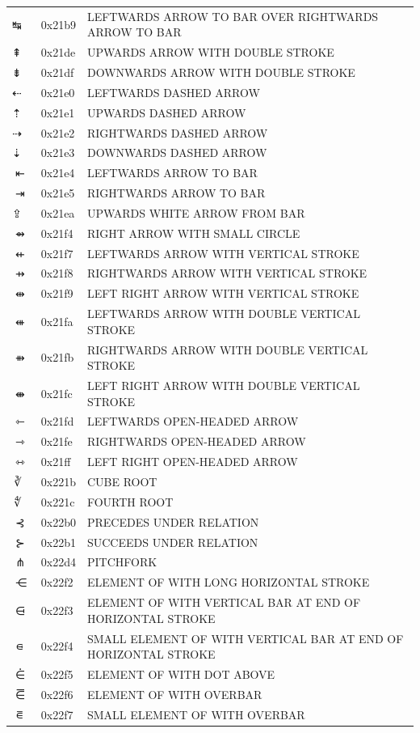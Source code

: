 \documentclass[12pt, twoside]{article}
\begin{document}
\begin{longtable}{L{1.0cm} L{2.0cm} >{\footnotesize}L{10cm}}
$↹$&0x21b9&LEFTWARDS ARROW TO BAR OVER RIGHTWARDS ARROW TO BAR\\
$⇞$&0x21de&UPWARDS ARROW WITH DOUBLE STROKE\\
$⇟$&0x21df&DOWNWARDS ARROW WITH DOUBLE STROKE\\
$⇠$&0x21e0&LEFTWARDS DASHED ARROW\\
$⇡$&0x21e1&UPWARDS DASHED ARROW\\
$⇢$&0x21e2&RIGHTWARDS DASHED ARROW\\
$⇣$&0x21e3&DOWNWARDS DASHED ARROW\\
$⇤$&0x21e4&LEFTWARDS ARROW TO BAR\\
$⇥$&0x21e5&RIGHTWARDS ARROW TO BAR\\
$⇪$&0x21ea&UPWARDS WHITE ARROW FROM BAR\\
$⇴$&0x21f4&RIGHT ARROW WITH SMALL CIRCLE\\
$⇷$&0x21f7&LEFTWARDS ARROW WITH VERTICAL STROKE\\
$⇸$&0x21f8&RIGHTWARDS ARROW WITH VERTICAL STROKE\\
$⇹$&0x21f9&LEFT RIGHT ARROW WITH VERTICAL STROKE\\
$⇺$&0x21fa&LEFTWARDS ARROW WITH DOUBLE VERTICAL STROKE\\
$⇻$&0x21fb&RIGHTWARDS ARROW WITH DOUBLE VERTICAL STROKE\\
$⇼$&0x21fc&LEFT RIGHT ARROW WITH DOUBLE VERTICAL STROKE\\
$⇽$&0x21fd&LEFTWARDS OPEN-HEADED ARROW\\
$⇾$&0x21fe&RIGHTWARDS OPEN-HEADED ARROW\\
$⇿$&0x21ff&LEFT RIGHT OPEN-HEADED ARROW\\
$∛$&0x221b&CUBE ROOT\\
$∜$&0x221c&FOURTH ROOT\\
$⊰$&0x22b0&PRECEDES UNDER RELATION\\
$⊱$&0x22b1&SUCCEEDS UNDER RELATION\\
$⋔$&0x22d4&PITCHFORK\\
$⋲$&0x22f2&ELEMENT OF WITH LONG HORIZONTAL STROKE\\
$⋳$&0x22f3&ELEMENT OF WITH VERTICAL BAR AT END OF HORIZONTAL STROKE\\
$⋴$&0x22f4&SMALL ELEMENT OF WITH VERTICAL BAR AT END OF HORIZONTAL STROKE\\
$⋵$&0x22f5&ELEMENT OF WITH DOT ABOVE\\
$⋶$&0x22f6&ELEMENT OF WITH OVERBAR\\
$⋷$&0x22f7&SMALL ELEMENT OF WITH OVERBAR\\

\end{longtable}
\end{document}
